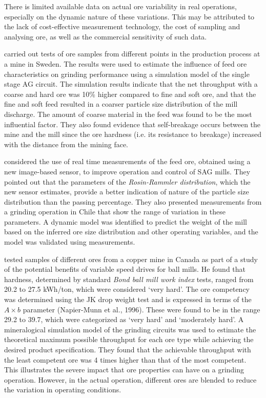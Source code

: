 There is limited available data on actual ore variability in real operations, especially on the dynamic nature of these variations. This may be attributed to the lack of cost-effective measurement technology, the cost of sampling and analysing ore, as well as the commercial sensitivity of such data.

\cite{hahne_ore_2003} carried out tests of ore samples from different points in the production process at a mine in Sweden. The results were used to estimate the influence of feed ore characteristics on grinding performance using a simulation model of the single stage \gls{AG} circuit. The simulation results indicate that the net throughput with a coarse and hard ore was 10\% higher compared to fine and soft ore, and that the fine and soft feed resulted in a coarser particle size distribution of the mill discharge. The amount of coarse material in the feed was found to be the most influential factor. They also found evidence that self-breakage occurs between the mine and the mill since the ore hardness (i.e. its resistance to breakage) increased with the distance from the mining face.

\cite{nunez_characterization_2011} considered the use of real time measurements of the feed ore, obtained using a new image-based sensor, to improve operation and control of \gls{SAG} mills. They pointed out that the parameters of the \textit{Rosin-Rammler distribution}, which the new sensor estimates, provide a better indication of nature of the particle size distribution than the passing percentage. They also presented measurements from a grinding operation in Chile that show the range of variation in these parameters. A dynamic model was identified to predict the weight of the mill based on the inferred ore size distribution and other operating variables, and the model was validated using measurements.

\cite{liu_development_2018} tested samples of different ores from a copper mine in Canada as part of a study of the potential benefits of variable speed drives for ball mills. He found that hardness, determined by standard \textit{Bond ball mill work index} tests, ranged from 20.2 to 27.5 \gls{kWh}/ton, which were considered `very hard'. The ore competency was determined using the JK drop weight test and is expressed in terms of the $A\times{b}$ parameter (Napier-Munn et al., 1996). These were found to be in the range 29.2 to 39.7, which were categorized as `very hard' and `moderately hard'. A mineralogical simulation model of the grinding circuits was used to estimate the theoretical maximum possible throughput for each ore type while achieving the desired product specification. They found that the achievable throughput with the least competent ore was 4 times higher than that of the most competent. This illustrates the severe impact that ore properties can have on a grinding operation. However, in the actual operation, different ores are blended to reduce the variation in operating conditions.

